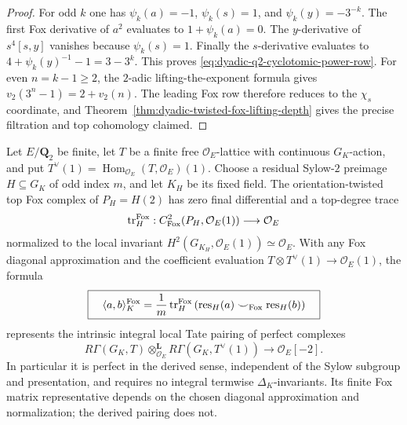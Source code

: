 \begin{proof}
For odd $k$ one has
$\psi_k(a)=-1$, $\psi_k(s)=1$,
and $\psi_k(y)=-3^{-k}$.
The first Fox derivative of $a^2$
evaluates to $1+\psi_k(a)=0$.
The $y$-derivative of $s^4[s,y]$
vanishes because $\psi_k(s)=1$.
Finally the $s$-derivative evaluates to
$4+\psi_k(y)^{-1}-1=3-3^k$.
This proves \eqref{eq:dyadic-q2-cyclotomic-power-row}.
For even $n=k-1\ge2$, the $2$-adic
lifting-the-exponent formula gives
$v_2(3^n-1)=2+v_2(n)$.
The leading Fox row therefore reduces to
the $\chi_s$ coordinate, and
Theorem~\ref{thm:dyadic-twisted-fox-lifting-depth}
gives the precise filtration and top
cohomology claimed.
\end{proof}
\begin{proposition}
\label{prop:dyadic-sylow-fox-tate-pairing}
Let $E/\mathbf Q_2$ be finite, let
$T$ be a finite free $\mathcal O_E$-lattice
with continuous $G_K$-action, and put
$T^\vee(1)=\operatorname{Hom}_{\mathcal O_E}
(T,\mathcal O_E)(1)$.
Choose a residual Sylow-$2$ preimage
$H\subseteq G_K$ of odd index $m$, and let
$K_H$ be its fixed field.
The orientation-twisted top Fox complex of
$P_H=H(2)$ has zero final differential and
a top-degree trace
\[
\operatorname{tr}_{H}^{\rm Fox}:
C^2_{\rm Fox}(P_H,\mathcal O_E(1))
\longrightarrow\mathcal O_E
\]
normalized to the local invariant
$H^2(G_{K_H},\mathcal O_E(1))
\simeq\mathcal O_E$.
With any Fox diagonal approximation and the
coefficient evaluation
$T\otimes T^\vee(1)\to\mathcal O_E(1)$,
the formula
\begin{equation}\label{eq:dyadic-transfer-tate-pairing}
\boxed{\quad
\langle a,b\rangle_K^{\rm Fox}
=
\frac1m\operatorname{tr}_{H}^{\rm Fox}
\left(
\operatorname{res}_{H}(a)
  \smile_{\rm Fox}
\operatorname{res}_{H}(b)
\right)\quad}
\end{equation}
represents the intrinsic integral local
Tate pairing of perfect complexes
\[
R\Gamma(G_K,T)\otimes_{\mathcal O_E}^{\mathbf L}
R\Gamma(G_K,T^\vee(1))
\longrightarrow\mathcal O_E[-2].
\]
In particular it is perfect in the derived
sense, independent of the Sylow subgroup and
presentation, and requires no integral
termwise $\Delta_K$-invariants.
Its finite Fox matrix representative depends
on the chosen diagonal approximation and
normalization; the derived pairing does not.
\end{proposition}

